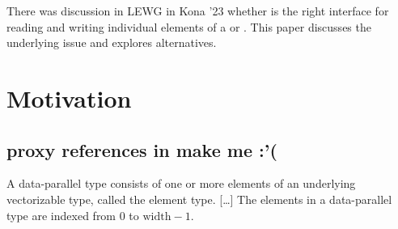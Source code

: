 \newcommand\wgTitle{Replace simd operator[] with getter and setter functions --- or not}
\newcommand\wgName{Matthias Kretz <m.kretz@gsi.de>}
\newcommand\wgDocumentNumber{P3275R0}
\newcommand\wgGroup{LEWG}
\newcommand\wgTarget{\CC{}26}
\newcommand\wgAcknowledgements{Daniel Towner and Ruslan Arutyunyan contributed
to this paper via discussions / reviews. Thanks also to Jeff Garland for reviewing.}

\usepackage{mymacros}
\usepackage{wg21}
\setcounter{tocdepth}{2} %
\hypersetup{bookmarksdepth=5}
\usepackage{changelog}
\usepackage{underscore}
\usepackage{multirow}



\newcommand\simd[1][]{\type{ba\-sic\_simd#1}\xspace}
\newcommand\simdT{\type{ba\-sic\_simd\MayBreak<\MayBreak{}T>}\xspace}
\newcommand\valuetype{\type{val\-ue\_type}\xspace}
\newcommand\referencetype{\type{ref\-er\-ence}\xspace}
\newcommand\mask[1][]{\type{ba\-sic\_simd\_mask#1}\xspace}
\newcommand\maskT{\type{ba\-sic\_simd\_mask\MayBreak<\MayBreak{}T>}\xspace}
\newcommand\wglink[1]{\href{https://wg21.link/#1}{#1}}

\newcommand\nativeabi{\UNSP{native-abi}}
\newcommand\deducet{\UNSP{deduce-t}}
\newcommand\simdsizev{\UNSP{simd-size-v}}
\newcommand\simdsizetype{\UNSP{simd-size-type}}
\newcommand\simdselect{\UNSP{simd-select-impl}}
\newcommand\maskelementsize{\UNSP{mask-element-size}}
\newcommand\integerfrom{\UNSP{integer-from}}
\newcommand\constexprwrapperlike{\UNSP{constexpr-wrapper-like}}

\renewcommand{\lst}[1]{Listing~\ref{#1}}
\renewcommand{\sect}[1]{Section~\ref{#1}}
\renewcommand{\ttref}[1]{Tony~Table~\ref{#1}}
\renewcommand{\tabref}[1]{Table~\ref{#1}}


\begin{wgTitlepage}
  There was discussion in LEWG in Kona '23 whether  is the
  right interface for reading and writing individual elements of a \simd or
  \mask.
  This paper discusses the underlying issue and explores alternatives.
\end{wgTitlepage}

\pagestyle{scrheadings}




\section{Motivation}
\subsection{proxy references in \CC{} make me :'(}
\begin{wgText}
  A data-parallel type consists of one or more elements of an underlying
  vectorizable type, called the element type.
  [\ldots]
  The elements in a data-parallel type are indexed from 0 to $\mathrm{width} - 1$.
\end{wgText}

